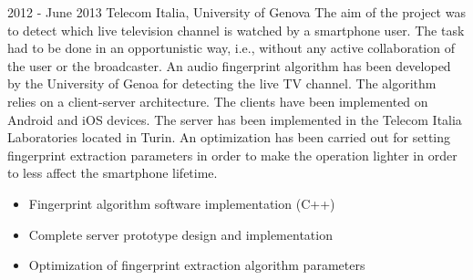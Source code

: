 {2012 - June 2013}
{Telecom Italia, University of Genova}
{The aim of the project was to detect which live television channel is watched by a smartphone user. The task had to be done in an opportunistic way, i.e., without any active collaboration of the user or the broadcaster. An audio fingerprint algorithm has been developed by the University of Genoa for detecting the live TV channel. The algorithm relies on a client-server architecture. The clients have been implemented on Android and iOS devices. The server has been implemented in the Telecom Italia Laboratories located in Turin. An optimization has been carried out for setting fingerprint extraction parameters in order to make the operation lighter in order to less affect the smartphone lifetime.}
{
\begin{itemize}[noitemsep,topsep=0pt,parsep=0pt,partopsep=0pt]
\item Fingerprint algorithm software implementation (C++)
\item Complete server prototype design and implementation
\item Optimization of fingerprint extraction algorithm parameters
\end{itemize}
} 
